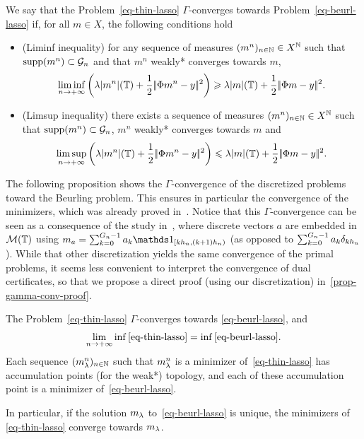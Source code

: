 \begin{defn}
  We say that the Problem~\eqref{eq-thin-lasso} $\Gamma$-converges towards Problem~\eqref{eq-beurl-lasso} if, for all $m\in X$, the following conditions hold
  \begin{itemize}
    \item{(Liminf inequality)} for any sequence of measures $(m^n)_{n\in\mathbb{N}}\in X^{\mathbb{N}}$ such that $\operatorname{supp}(m^n)\subset\mathcal{G}_n$ and that $m^n$ weakly* converges towards $m$, 
      \begin{align*}
        \liminf_{n\to +\infty}\left(\lambda |m^n|(\mathbb{T})+\frac{1}{2}|\!| \Phi m^n-y |\!|^2\right) \geqslant \lambda |m|(\mathbb{T}) + \frac{1}{2}|\!| \Phi m-y |\!|^2.
      \end{align*}
    \item{(Limsup inequality)} there exists a sequence of measures $(m^n)_{n\in \mathbb{N}}\in X^{\mathbb{N}}$ such that $\operatorname{supp}(m^n)\subset \mathcal{G}_n$, $m^n$ weakly* converges towards $m$  and
      \begin{align*}
        \limsup_{n\to +\infty} \left(\lambda |m^n|(\mathbb{T})+\frac{1}{2}|\!| \Phi m^n-y |\!|^2\right) \leqslant \lambda |m|(\mathbb{T}) + \frac{1}{2}|\!| \Phi m-y |\!|^2.
      \end{align*}
  \end{itemize}
  \label{def-gammacv}
\end{defn}

The following proposition shows the $\Gamma$-convergence of the discretized problems toward the Beurling \lasso problem.  This ensures in particular the convergence of the minimizers, which was already proved in~\cite{TangConvergence}. 
Notice that this $\Gamma$-convergence can be seen as a consequence of the study in~\cite{PiaThesis}, where discrete vectors $a$ are embedded in $\mathcal{M}(\mathbb{T})$ using $m_a=\sum_{k=0}^{\taillegridn-1}a_k\bun_{[k\stepsizen,(k+1)\stepsizen)}$ (as opposed to $\sum_{k=0}^{{G_n}-1} a_k\delta_{k{h_n}}$). While that other discretization yields the same convergence of the primal problems, it seems less convenient to interpret the convergence of dual certificates, so that we propose a direct proof (using our discretization) in~\ref{prop-gamma-conv-proof}.

  \begin{prop}\label{prop-gamma-conv}
  The Problem~\eqref{eq-thin-lasso} $\Gamma$-converges towards \eqref{eq-beurl-lasso}, and 
\begin{align}
  \lim_{n\to +\infty} \inf \eqref{eq-thin-lasso} = \inf \eqref{eq-beurl-lasso}.\label{eq-cvinf-lasso}
\end{align}
Each sequence $(m^n_\lambda)_{n\in\mathbb{N}}$ such that $m^n_\lambda$ is a minimizer of~\eqref{eq-thin-lasso} has accumulation points (for the weak*) topology, and each of these accumulation point is a minimizer of~\eqref{eq-beurl-lasso}.
\label{prop-gammacv-lasso}
\end{prop}
In particular, if the solution $m_\lambda$ to~\eqref{eq-beurl-lasso} is unique, the minimizers of \eqref{eq-thin-lasso} converge towards $m_\lambda$.

